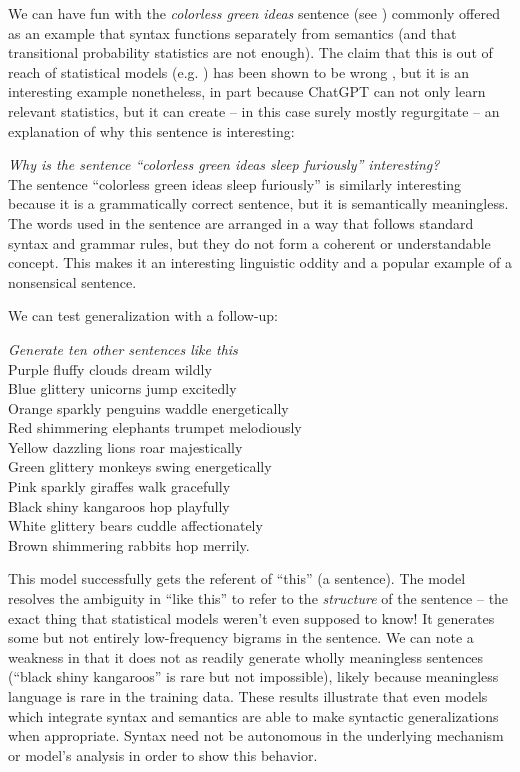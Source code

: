 \documentclass[output=paper,colorlinks,citecolor=brown]{langscibook}
\begin{document}
We can have fun with the \textit{colorless green ideas} sentence (see \citealt{gulordava2018colorless}) commonly offered as an example that syntax functions separately from semantics (and that transitional probability statistics are not enough). The claim that this is out of reach of statistical models (e.g. \citealt{chomsky1957syntactic}) has been shown to be wrong \citep{pereira2000formal,norvig2012colorless,gulordava2018colorless}, but it is an interesting example nonetheless, in part because ChatGPT can not only learn relevant statistics, but it can create -- in this case surely mostly regurgitate -- an explanation of why this sentence is interesting:

\begin{myquote}
\textit{Why is the sentence ``colorless green ideas sleep furiously'' interesting?}\medskip\\
\noindent The sentence ``colorless green ideas sleep furiously'' is similarly interesting because it is a grammatically correct sentence, but it is semantically meaningless. The words used in the sentence are arranged in a way that follows standard syntax and grammar rules, but they do not form a coherent or understandable concept. This makes it an interesting linguistic oddity and a popular example of a nonsensical sentence.
\end{myquote}

\noindent We can test generalization with a follow-up:

\begin{myquote}
\textit{Generate ten other sentences like this}\medskip\\
\noindent Purple fluffy clouds dream wildly\\
Blue glittery unicorns jump excitedly\\
Orange sparkly penguins waddle energetically\\
Red shimmering elephants trumpet melodiously\\
Yellow dazzling lions roar majestically\\
Green glittery monkeys swing energetically\\
Pink sparkly giraffes walk gracefully\\
Black shiny kangaroos hop playfully\\
White glittery bears cuddle affectionately\\
Brown shimmering rabbits hop merrily.
\end{myquote}

\noindent This model successfully gets the referent of ``this'' (a sentence). The model resolves the ambiguity in ``like this'' to refer to the \textit{structure} of the sentence -- the exact thing that statistical models weren't even supposed to know! It generates some but not entirely low-frequency bigrams in the sentence. We can note a weakness in that it does not as readily generate wholly meaningless sentences (``black shiny kangaroos'' is rare but not impossible), likely because meaningless language is rare in the training data. These results illustrate that even models which integrate syntax and semantics are able to make syntactic generalizations when appropriate. Syntax need not be autonomous in the underlying mechanism or model's analysis in order to show this behavior. 
\end{document}
